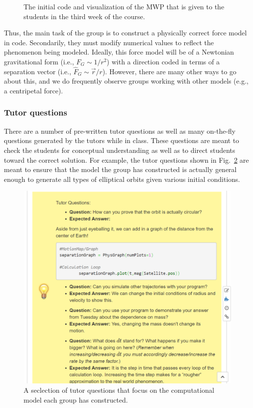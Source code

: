 \documentclass{msuphddissertation}
\begin{document}
\begin{doublespace}
\begin{figure}[ht]
\caption{The initial code and visualization of the MWP that is given to the students in the third week of the course.}\label{CH3:InitialCodeVisual}
\end{figure}

Thus, the main task of the group is to construct a physically correct force model in code.  Secondarily, they must modify numerical values to reflect the phenomenon being modeled.  Ideally, this force model will be of a Newtonian gravitational form (i.e., $F_{G}\sim1/r^{2}$) with a direction coded in terms of a separation vector (i.e., $\hat{F}_{G}\sim\vec{r}/r$).  However, there are many other ways to go about this, and we do frequently observe groups working with other models (e.g., a centripetal force).

\subsubsection{Tutor questions}

There are a number of pre-written tutor questions as well as many on-the-fly questions generated by the tutors while in class.  These questions are meant to check the students for conceptual understanding as well as to direct students toward the correct solution.  For example, the tutor questions shown in Fig.~\ref{CH3:TutorQuestion} are meant to ensure that the model the group has constructed is actually general enough to generate all types of elliptical orbits given various initial conditions.

\begin{figure}[ht]\centering
\includegraphics[scale=0.5]{images/CH3TutorQuestion.pdf}
\caption{A seclection of tutor questions that focus on the computational model each group has constructed.}\label{CH3:TutorQuestion}
\end{figure}


\end{doublespace}
\end{document}

